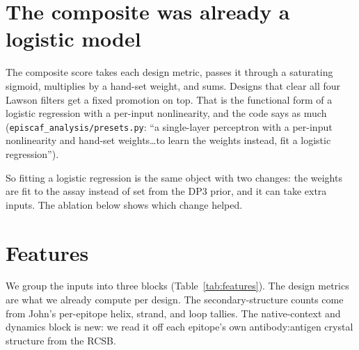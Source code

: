 \documentclass[11pt]{article}
\begin{document}
\section{The composite was already a logistic model}

The composite score takes each
design metric, passes it through a saturating sigmoid, multiplies by a hand-set weight, and sums.
Designs that clear all four Lawson filters get a fixed promotion on top. That is the functional
form of a logistic regression with a per-input nonlinearity, and the code says as much
(\texttt{episcaf\_analysis/presets.py}: ``a single-layer perceptron with a per-input nonlinearity and
hand-set weights\ldots to learn the weights instead, fit a logistic regression'').

So fitting a logistic regression is the same object with two changes:
the weights are fit to the assay instead of set from the DP3 prior, and it can take extra inputs. The
ablation below shows which change helped.

\section{Features}

We group the inputs into three blocks (Table~\ref{tab:features}). The design metrics are what we
already compute per design. The secondary-structure counts come from John's per-epitope helix, strand,
and loop tallies. The native-context and dynamics block is new: we read it off each epitope's own
antibody:antigen crystal structure from the RCSB.
\end{document}
